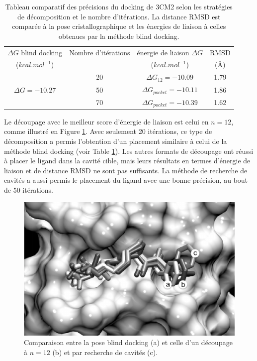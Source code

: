  \begin{table}
 	\begin{center}
 		\caption{Tableau comparatif des précisions du docking de 3CM2 selon les stratégies de décomposition et le nombre d'itérations. La distance RMSD est comparée à la pose cristallographique et les énergies de liaison à celles obtenues par la méthode blind docking.}\label{tab:rmsd}
 		\begin{tabular}{|c|c|c|c|}
 			\hline 
 			$\Delta G$ blind docking & Nombre d'itérations & énergie de liaison $\Delta G$ & RMSD  \\ 
 			($kcal.mol^{-1}$)  &  & ($kcal.mol^{-1}$) &  (\AA{}) \\
 			\hline 
 			\multirow{3}{*}{$\Delta G = -10.27$}  & 20 & $\Delta G_{12} = -10.09$ & 1.79 \\ \cline{2-4}
 			& 50 & $\Delta G_{pocket} = -10.11$ & 1.86 \\ \cline{2-4}
 			& 70 & $\Delta G_{pocket} = -10.39$ & 1.62 \\ \cline{2-4}
 			\hline 
 		\end{tabular} 
 	\end{center}
 \end{table}
 
Le découpage avec le meilleur score d'énergie de liaison est celui en $n = 12$, comme illustré en Figure \ref{fig:cuts}. Avec seulement 20 itérations, ce type de décomposition a permis l'obtention d'un placement similaire à celui de la méthode blind docking (voir Table \ref{tab:rmsd}). Les autres formats de découpage ont réussi à placer le ligand dans la cavité cible, mais leurs résultats en termes d'énergie de liaison et de distance RMSD ne sont pas suffisants. La méthode de recherche de cavités a aussi permis le placement du ligand avec une bonne précision, au bout de 50 itérations. 


 
 \begin{figure}[h]
 	\centering
 		\includegraphics[width=0.75\linewidth]{images/Romain/fig5-bw} 
 		\caption{Comparaison entre la pose blind docking (a) et celle d'un découpage à $n=12$ (b) et par recherche de cavités (c). }\label{fig:cuts} %
 \end{figure}

